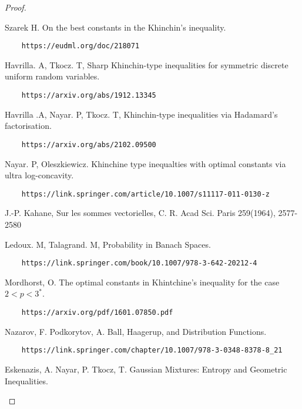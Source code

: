 \documentclass[10pt]{article}
\newcommand{\1}{\textbf{1}}
\theoremstyle{remark}
\theoremstyle{definition}
\begin{document}
\begin{proof}
\begin{thebibliography}{9}
 Szarek H. On the best constants in the Khinchin's inequality. 

\begin{verbatim}
	https://eudml.org/doc/218071
\end{verbatim}

 Havrilla. A, Tkocz. T, Sharp Khinchin-type inequalities for symmetric discrete uniform random variables. 

\begin{verbatim}
	https://arxiv.org/abs/1912.13345
\end{verbatim}

 Havrilla .A, Nayar. P, Tkocz. T, Khinchin-type inequalities via Hadamard's factorisation. 

\begin{verbatim}
	https://arxiv.org/abs/2102.09500
\end{verbatim}

 Nayar. P, Oleszkiewicz. Khinchine type inequalties with optimal constants via ultra log-concavity. 

\begin{verbatim}
	https://link.springer.com/article/10.1007/s11117-011-0130-z
\end{verbatim}

 J.-P. Kahane, Sur les sommes vectorielles, C. R. Acad Sci. Paris 259(1964), 2577-2580

 Ledoux. M, Talagrand. M, Probability in Banach Spaces. 

\begin{verbatim}
	https://link.springer.com/book/10.1007/978-3-642-20212-4
\end{verbatim}

 Mordhorst, O. The optimal constants in Khintchine's inequality for the case $2 < p < 3^*$. 

\begin{verbatim}
	https://arxiv.org/pdf/1601.07850.pdf
\end{verbatim}

 Nazarov, F. Podkorytov, A. Ball, Haagerup, and Distribution Functions. 

\begin{verbatim}
	https://link.springer.com/chapter/10.1007/978-3-0348-8378-8_21
\end{verbatim}

 Eskenazis, A. Nayar, P. Tkocz, T. Gaussian Mixtures: Entropy and Geometric Inequalities.


\end{thebibliography}
\end{proof}
\end{document}
